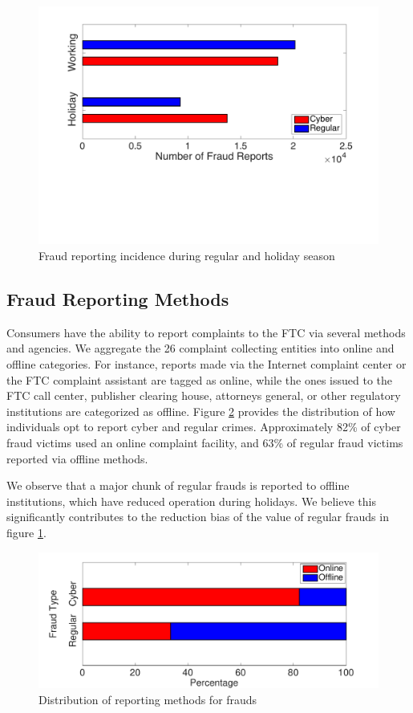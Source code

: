 \documentclass[conference]{IEEEtran}
\begin{document}
\begin{figure}[t]
\centering
  \includegraphics[scale=0.35]{graphics/reg_vs_holiday.pdf}
  \caption{Fraud reporting incidence during regular and holiday season}
  \label{temporal}
\end{figure}


\subsection{Fraud Reporting Methods}\label{reportingmethods}


Consumers have the ability to report complaints to the FTC via several methods and agencies. We aggregate the 26 complaint collecting entities into online and offline categories. For instance, reports made via the Internet complaint center or the FTC complaint assistant are tagged as online, while the ones issued to the FTC call center, publisher clearing house, attorneys general, or other regulatory institutions are categorized as offline. Figure \ref{reportingfig} provides the distribution of how individuals opt to report cyber and regular crimes. Approximately 82\% of cyber fraud victims used an online complaint facility, and 63\% of regular fraud victims reported via offline methods.

We observe that a major chunk of regular frauds is reported to offline institutions, which have reduced operation during holidays. We believe this significantly contributes to the reduction bias of the value of regular frauds in figure \ref{temporal}. 


 \begin{figure}[t]
\centering
  \includegraphics[scale=0.35]{graphics/reporting_methods.pdf}
  \caption{Distribution of reporting methods for frauds}
  \label{reportingfig}
\end{figure}
\end{document}

